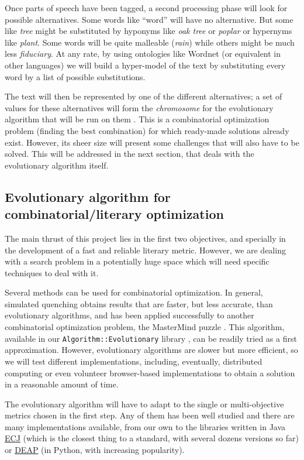 \documentclass[a4paper,12pt,twocolumn]{article}
\begin{document}
Once parts of speech have been tagged, a second processing phase will
look for possible alternatives. Some words like ``word'' will have no
alternative. But some like {\em tree} might be substituted by hyponyms
like {\em oak tree} or {\em poplar} or hypernyms like {\em plant}.
Some words will be quite malleable ({\em rain}) while others might be
much less {\em fiduciary}. At any rate, by using ontologies like
Wordnet (or equivalent in other languages) we will build a hyper-model
of the text by substituting every word by a list of possible
substitutions.

The text will then be represented by one of the different
alternatives; a set of values for these alternatives will form the
{\em chromosome} for the evolutionary algorithm that will be run on
them \cite{eiben2002evolutionary}. This is a combinatorial
optimization problem (finding the best combination) for which
ready-made solutions already exist. However, its sheer size will
present some challenges that will also have to be solved. This will be
addressed in the next section, that deals with the evolutionary
algorithm itself.

\subsection{Evolutionary algorithm for combinatorial/literary optimization}

The main thrust of this project lies in the first two objectives, and
specially in the development of a fast and reliable literary
metric. However, we are dealing with a search problem in a potentially
huge space which will need specific techniques to deal with it.

Several methods can be used for combinatorial optimization. In
general, simulated quenching
\cite{DBLP:journals/apin/CastilloARMGLG12} obtains results that are
faster, but less accurate, than evolutionary algorithms, and has been
applied successfully to another combinatorial optimization problem,
the MasterMind puzzle \cite{jj-ppsn96}. This algorithm, available in
our {\tt Algorithm::Evolutionary} library \cite{ae09}, can be readily
tried as a first approximation. However, evolutionary algorithms are
slower but more efficient, so we will test different implementations,
including, eventually, distributed computing or even volunteer
browser-based implementations \cite{gecco07:workshop:dcor,} to obtain
a solution in a reasonable amount of time. 

The evolutionary algorithm will have to adapt to the single or
multi-objective metrics chosen in the first step. Any of them has been
well studied and there are many implementations available, from our
own to the libraries written in Java \href{DBLP:conf/iwann/MereloRACML11}{ECJ} (which is the closest thing
to a standard, with several dozens versions so far) or \href{http://code.google.com/p/deap/}{DEAP} (in
Python, with increasing popularity). 
\end{document}
